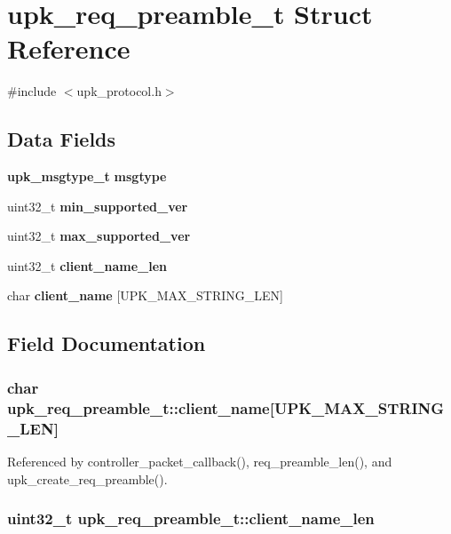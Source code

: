 \section{upk\_\-req\_\-preamble\_\-t Struct Reference}
\label{structupk__req__preamble__t}


{\ttfamily \#include $<$upk\_\-protocol.h$>$}

\subsection*{Data Fields}
\begin{DoxyCompactItemize}
\item 
{\bf upk\_\-msgtype\_\-t} {\bf msgtype}
\item 
uint32\_\-t {\bf min\_\-supported\_\-ver}
\item 
uint32\_\-t {\bf max\_\-supported\_\-ver}
\item 
uint32\_\-t {\bf client\_\-name\_\-len}
\item 
char {\bf client\_\-name} [UPK\_\-MAX\_\-STRING\_\-LEN]
\end{DoxyCompactItemize}


\subsection{Field Documentation}
\subsubsection[{client\_\-name}]{\setlength{\rightskip}{0pt plus 5cm}char {\bf upk\_\-req\_\-preamble\_\-t::client\_\-name}[UPK\_\-MAX\_\-STRING\_\-LEN]}\label{structupk__req__preamble__t_ae5e8a220f9d9beeba78c82a9b0a46ce1}


Referenced by controller\_\-packet\_\-callback(), req\_\-preamble\_\-len(), and upk\_\-create\_\-req\_\-preamble().

\subsubsection[{client\_\-name\_\-len}]{\setlength{\rightskip}{0pt plus 5cm}uint32\_\-t {\bf upk\_\-req\_\-preamble\_\-t::client\_\-name\_\-len}}\label{structupk__req__preamble__t_ab7c7470433e8489c766b23a63e4c08a5}


